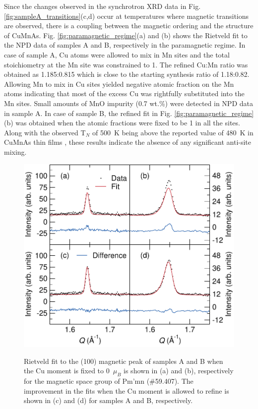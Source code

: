\documentclass[10pt,doublespacing,edeposit]{uiucthesis2020}
\begin{document}
\begin{mainmatter}
Since the changes observed in the synchrotron XRD data in Fig. \ref{fig:sampleA_transitions}(c,d) occur at temperatures where magnetic transitions are observed, there is a coupling between the magnetic ordering and the structure of CuMnAs. Fig. \ref{fig:paramagnetic_regime}(a) and (b) shows the Rietveld fit to the NPD data of samples A and B, respectively in the paramagnetic regime. In case of sample A, Cu atoms were allowed to mix in Mn sites and the total stoichiometry at the Mn site was constrained to 1. The refined Cu:Mn ratio was obtained as 1.185:0.815 which is close to the starting synthesis ratio of 1.18:0.82. Allowing Mn to mix in Cu sites yielded negative atomic fraction on the Mn atoms indicating that most of the excess Cu was rightfully substituted into the Mn sites. Small amounts of MnO impurity (0.7 wt.\%) were detected in NPD data in sample A. In case of sample B, the refined fit in Fig. \ref{fig:paramagnetic_regime}(b) was obtained when the atomic fractions were fixed to be 1 in all the sites. Along with the observed T$_N$ of 500~K being above the reported value of 480~K in CuMnAs thin films \cite{Wadley2015}, these results indicate the absence of any significant anti-site mixing.


\begin{figure}
\centering\includegraphics[width=0.8\columnwidth]{figures/ch7/400K_ECHINDA_POWGEN_mag_peaks_cropped.pdf} \\
\caption{\label{fig:400K_NPD_data}
Rietveld fit to the (100) magnetic peak of samples A and B when the Cu moment is fixed to 0~$\mu_B$ is shown in (a) and (b), respectively for the magnetic space group of Pm'mn (\#59.407). The improvement in the fits when the Cu moment is allowed to refine is shown in (c) and (d) for samples A and B, respectively.
} 
\end{figure}


\end{mainmatter}
\end{document}
